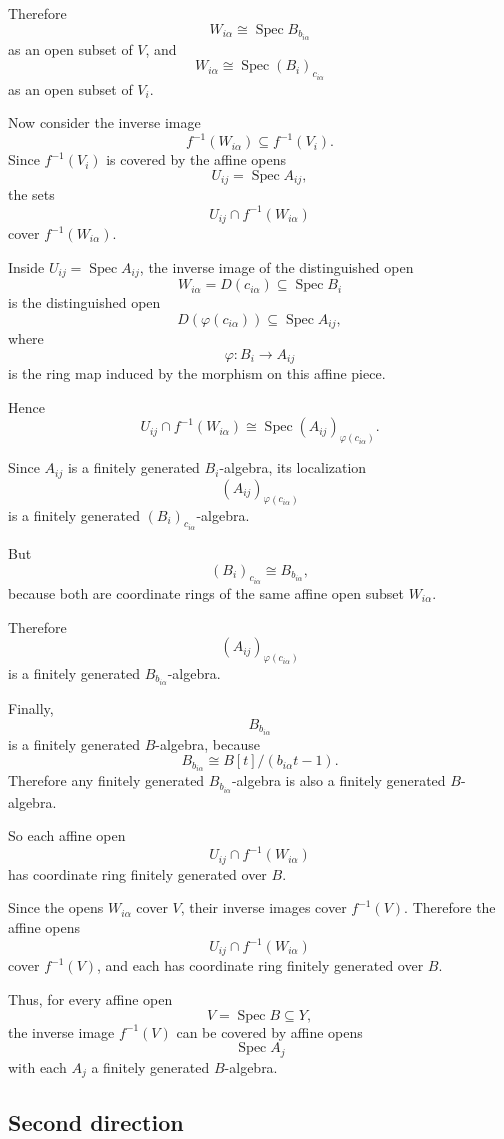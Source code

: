 \documentclass[12pt,a4paper]{article}
\DeclareMathOperator{\Spec}{Spec}
\providecommand{\Spec}{\operatorname{Spec}}
\theoremstyle{notespace}
\begin{document}
Therefore
\[
W_{i\alpha}\cong \Spec B_{b_{i\alpha}}
\]
as an open subset of \(V\), and
\[
W_{i\alpha}\cong \Spec (B_i)_{c_{i\alpha}}
\]
as an open subset of \(V_i\).

Now consider the inverse image
\[
f^{-1}(W_{i\alpha})\subseteq f^{-1}(V_i).
\]
Since \(f^{-1}(V_i)\) is covered by the affine opens
\[
U_{ij}=\Spec A_{ij},
\]
the sets
\[
U_{ij}\cap f^{-1}(W_{i\alpha})
\]
cover \(f^{-1}(W_{i\alpha})\).

Inside \(U_{ij}=\Spec A_{ij}\), the inverse image of the distinguished open
\[
W_{i\alpha}=D(c_{i\alpha})\subseteq \Spec B_i
\]
is the distinguished open
\[
D(\varphi(c_{i\alpha}))\subseteq \Spec A_{ij},
\]
where
\[
\varphi:B_i\to A_{ij}
\]
is the ring map induced by the morphism on this affine piece.

Hence
\[
U_{ij}\cap f^{-1}(W_{i\alpha})
\cong
\Spec (A_{ij})_{\varphi(c_{i\alpha})}.
\]

Since \(A_{ij}\) is a finitely generated \(B_i\)-algebra, its localization
\[
(A_{ij})_{\varphi(c_{i\alpha})}
\]
is a finitely generated \((B_i)_{c_{i\alpha}}\)-algebra.

But
\[
(B_i)_{c_{i\alpha}}\cong B_{b_{i\alpha}},
\]
because both are coordinate rings of the same affine open subset \(W_{i\alpha}\).

Therefore
\[
(A_{ij})_{\varphi(c_{i\alpha})}
\]
is a finitely generated \(B_{b_{i\alpha}}\)-algebra.

Finally,
\[
B_{b_{i\alpha}}
\]
is a finitely generated \(B\)-algebra, because
\[
B_{b_{i\alpha}}\cong B[t]/(b_{i\alpha}t-1).
\]
Therefore any finitely generated \(B_{b_{i\alpha}}\)-algebra is also a finitely generated \(B\)-algebra.

So each affine open
\[
U_{ij}\cap f^{-1}(W_{i\alpha})
\]
has coordinate ring finitely generated over \(B\).

Since the opens \(W_{i\alpha}\) cover \(V\), their inverse images cover \(f^{-1}(V)\). Therefore the affine opens
\[
U_{ij}\cap f^{-1}(W_{i\alpha})
\]
cover \(f^{-1}(V)\), and each has coordinate ring finitely generated over \(B\).

Thus, for every affine open
\[
V=\Spec B\subseteq Y,
\]
the inverse image \(f^{-1}(V)\) can be covered by affine opens
\[
\Spec A_j
\]
with each \(A_j\) a finitely generated \(B\)-algebra.

\subsection*{Second direction}
\end{document}
